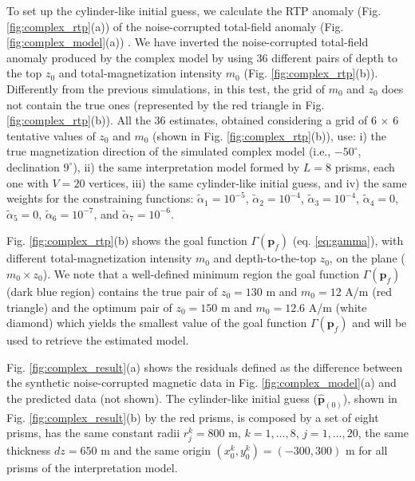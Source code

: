 To set up the cylinder-like initial guess, we calculate the RTP anomaly (Fig. \ref{fig:complex_rtp}(a)) of the noise-corrupted total-field anomaly 
(Fig. \ref{fig:complex_model}(a)) .
We have inverted the noise-corrupted total-field anomaly produced by the complex model by using 36 different pairs of depth to the top $ z_0 $ and total-magnetization intensity 
$ m_0 $ (Fig. \ref{fig:complex_rtp}(b)). 
Differently from the previous simulations, in this test, the grid of $ m_0 $ and $ z_0 $ 
does not contain the true ones (represented by the red triangle in Fig. \ref{fig:complex_rtp}(b)). 
All the $ 36 $ estimates, obtained considering a grid of 6 $\times$ 6 tentative values of $z_0$ and $m_0$ (shown in Fig. \ref{fig:complex_rtp}(b)), use: i) the true magnetization direction of the simulated complex model (i.e., $ -50^\circ $, declination $ 9^\circ $), ii) the same interpretation model formed by $ L = 8 $ prisms, each one with $ V = 20 $ vertices, iii) the same cylinder-like initial guess, and iv) the same weights for the constraining functions: 
$\tilde{\alpha}_1 = 10^{-5}$, 
$\tilde{\alpha}_2 = 10^{-4}$, 
$\tilde{\alpha}_3 = 10^{-4}$, 
$\tilde{\alpha}_4 = 0$, 
$\tilde{\alpha}_5 = 0$, 
$\tilde{\alpha}_6 = 10^{-7}$, and 
$\tilde{\alpha}_7 = 10^{-6}$. 

Fig. \ref{fig:complex_rtp}(b) shows the goal function $ \Gamma(\mathbf{p}_f) $ (eq. \ref{eq:gamma}), with different total-magnetization intensity $ m_0 $ and depth-to-the-top $z_0$, on the plane ($ m_0 \times z_0 $). 
We note that a well-defined minimum region the goal function $\Gamma(\mathbf{p}_f)$ (dark blue region) contains the true pair of $z_0 = 130$ m and $m_0 = 12 $ A/m (red triangle) and the optimum pair of 
$z_0 = 150$ m and $m_0 = 12.6 $ A/m (white diamond) which yields the smallest value of the goal function $\Gamma(\mathbf{p}_f)$ and will be used to retrieve the estimated model.


Fig. \ref{fig:complex_result}(a) shows the residuals defined as the difference
between the synthetic noise-corrupted magnetic data in Fig. \ref{fig:complex_model}(a) 
and the predicted data (not shown).
The cylinder-like initial guess ($ \hat{\mathbf{p}}_{(0)} $), shown 
in Fig. \ref{fig:complex_result}(b) by the red prisms, is composed by a set of eight prisms, has the same constant radii $ r^k_j = 800 $ m, $ k = 1, \dots, 8 $, $ j = 1, \dots, 20 $, 
the same thickness $ dz = 650 $ m and the same origin 
$ (x^k_0, y^k_0) = (-300, 300) $ m for all prisms of the interpretation model.

